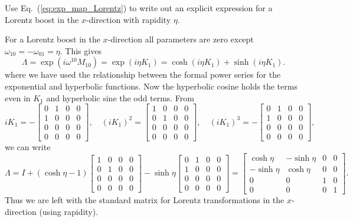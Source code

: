 \documentclass[notes.tex]{subfiles}
\begin{document}
\begin{Exercise}[]
Use Eq.~(\ref{eq:exp_map_Lorentz}) to write out an explicit expression for a Lorentz boost in the $x$-direction with rapidity $\eta$.
\end{Exercise}
\begin{Answer} 
For a Lorentz boost in the $x$-direction all parameters are zero except $\omega_{10}=-\omega_{01}=\eta$. This gives
\begin{equation*}
\Lambda = \exp(i\omega^{10}M_{10})= \exp(i\eta K_1)=\cosh(i\eta K_1)+\sinh(i\eta K_1).
\end{equation*}
where we have used the relationship between the formal power series for the exponential and hyperbolic functions. Now the hyperbolic cosine holds the terms even in $K_1$ and hyperbolic sine the odd terms. From
\[iK_1 = - \left[\begin{matrix} 0 & 1  & 0 &  0\\  1 & 0 & 0 & 0 \\  0 & 0 & 0 & 0 \\ 0 & 0 & 0 & 0 \end{matrix}\right], \quad
(iK_1)^2 = \left[\begin{matrix} 1 & 0  & 0 &  0\\  0 & 1 & 0 & 0 \\  0 & 0 & 0 & 0 \\ 0 & 0 & 0 & 0 \end{matrix}\right], \quad
(iK_1)^3 = -\left[\begin{matrix} 0 & 1  & 0 &  0\\  1 & 0 & 0 & 0 \\  0 & 0 & 0 & 0 \\ 0 & 0 & 0 & 0 \end{matrix}\right], \]
we can write
\begin{equation*}
\Lambda = I+ (\cosh\eta-1)\left[\begin{matrix} 1 & 0  & 0 &  0\\  0 & 1 & 0 & 0 \\  0 & 0 & 0 & 0 \\ 0 & 0 & 0 & 0 \end{matrix}\right]-\sinh\eta\left[\begin{matrix} 0 & 1  & 0 &  0\\  1 & 0 & 0 & 0 \\  0 & 0 & 0 & 0 \\ 0 & 0 & 0 & 0 \end{matrix}\right]
=\left[\begin{matrix} \cosh\eta & -\sinh\eta  & 0 & 0 \\  -\sinh\eta & \cosh\eta & 0 & 0 \\  0 & 0 & 1 & 0 \\ 0 & 0 & 0 & 1 \end{matrix}\right].
\end{equation*}
Thus we are left with the standard matrix for Lorentz transformations in the $x$-direction (using rapidity).
\end{Answer}
\end{document}
